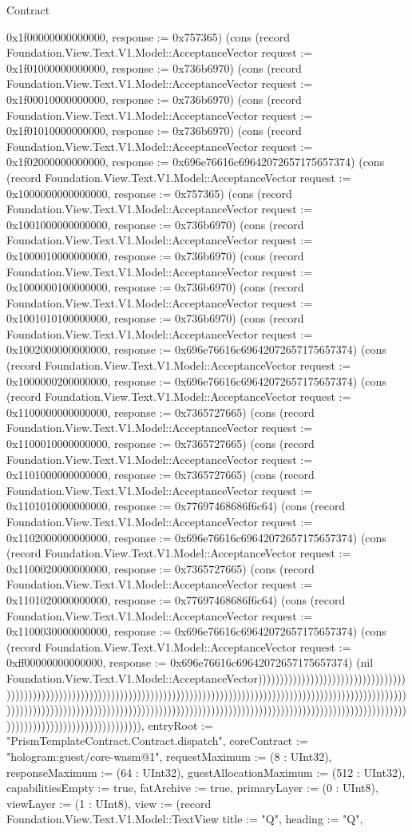 \begin{lexlean}{Contract}
\begin{semanticmodule}
{0x1f00000000000000, response := 0x757365}) (cons (record Foundation.View.Text.V1.Model::AcceptanceVector {request := 0x1f01000000000000, response := 0x736b6970}) (cons (record Foundation.View.Text.V1.Model::AcceptanceVector {request := 0x1f00010000000000, response := 0x736b6970}) (cons (record Foundation.View.Text.V1.Model::AcceptanceVector {request := 0x1f01010000000000, response := 0x736b6970}) (cons (record Foundation.View.Text.V1.Model::AcceptanceVector {request := 0x1f02000000000000, response := 0x696e76616c69642072657175657374}) (cons (record Foundation.View.Text.V1.Model::AcceptanceVector {request := 0x1000000000000000, response := 0x757365}) (cons (record Foundation.View.Text.V1.Model::AcceptanceVector {request := 0x1001000000000000, response := 0x736b6970}) (cons (record Foundation.View.Text.V1.Model::AcceptanceVector {request := 0x1000010000000000, response := 0x736b6970}) (cons (record Foundation.View.Text.V1.Model::AcceptanceVector {request := 0x1000000100000000, response := 0x736b6970}) (cons (record Foundation.View.Text.V1.Model::AcceptanceVector {request := 0x1001010100000000, response := 0x736b6970}) (cons (record Foundation.View.Text.V1.Model::AcceptanceVector {request := 0x1002000000000000, response := 0x696e76616c69642072657175657374}) (cons (record Foundation.View.Text.V1.Model::AcceptanceVector {request := 0x1000000200000000, response := 0x696e76616c69642072657175657374}) (cons (record Foundation.View.Text.V1.Model::AcceptanceVector {request := 0x1100000000000000, response := 0x7365727665}) (cons (record Foundation.View.Text.V1.Model::AcceptanceVector {request := 0x1100010000000000, response := 0x7365727665}) (cons (record Foundation.View.Text.V1.Model::AcceptanceVector {request := 0x1101000000000000, response := 0x7365727665}) (cons (record Foundation.View.Text.V1.Model::AcceptanceVector {request := 0x1101010000000000, response := 0x77697468686f6c64}) (cons (record Foundation.View.Text.V1.Model::AcceptanceVector {request := 0x1102000000000000, response := 0x696e76616c69642072657175657374}) (cons (record Foundation.View.Text.V1.Model::AcceptanceVector {request := 0x1100020000000000, response := 0x7365727665}) (cons (record Foundation.View.Text.V1.Model::AcceptanceVector {request := 0x1101020000000000, response := 0x77697468686f6c64}) (cons (record Foundation.View.Text.V1.Model::AcceptanceVector {request := 0x1100030000000000, response := 0x696e76616c69642072657175657374}) (cons (record Foundation.View.Text.V1.Model::AcceptanceVector {request := 0xff00000000000000, response := 0x696e76616c69642072657175657374}) (nil Foundation.View.Text.V1.Model::AcceptanceVector))))))))))))))))))))))))))))))))))))))))))))))))))))))))))))))))))))))))))))))))))))))))))))))))))))))))))))))))))))))))))))))))))))))))))))))))))))))))))))))))))))))))))))))))))))))))))))))))))))))))))))))))))))))))))))))))))))))))))))))))))))))))), entryRoot := "PrismTemplateContract.Contract.dispatch", coreContract := "hologram:guest/core-wasm@1", requestMaximum := (8 : UInt32), responseMaximum := (64 : UInt32), guestAllocationMaximum := (512 : UInt32), capabilitiesEmpty := true, fatArchive := true, primaryLayer := (0 : UInt8), viewLayer := (1 : UInt8), view := (record Foundation.View.Text.V1.Model::TextView {title := "Q", heading := "Q", }
\end{semanticmodule}
\end{lexlean}
